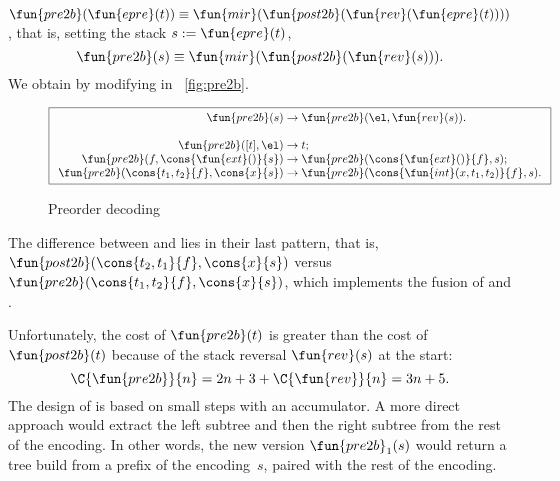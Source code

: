 \(\fun{pre2b}(\fun{epre}(t)) \equiv
\fun{mir}(\fun{post2b}(\fun{rev}(\fun{epre}(t))))\), that is, setting
the stack \(s := \fun{epre}(t)\),
\begin{equation*}
\abovedisplayskip=7pt
\belowdisplayskip=7pt
\fun{pre2b}(s) \equiv \fun{mir}(\fun{post2b}(\fun{rev}(s))).
\end{equation*}
We obtain  by modifying
 in \fig~\vref{fig:pre2b}.
\begin{figure}
\begin{equation*}
\boxed{
\begin{array}{r@{\;}c@{\;}l}
\fun{pre2b}(s) & \rightarrow & \fun{pre2b}(\el,\fun{rev}(s)).\\
\\
\fun{pre2b}([t],\el) & \rightarrow & t;\\
\fun{pre2b}(f,\cons{\fun{ext}()}{s}) & \rightarrow & \fun{pre2b}(\cons{\fun{ext}()}{f},s);\\
\fun{pre2b}(\cons{t_1,t_2}{f},\cons{x}{s}) & \rightarrow &
\fun{pre2b}(\cons{\fun{int}(x,t_1,t_2)}{f},s).
\end{array}}
\end{equation*}
\caption{Preorder decoding}
\label{fig:pre2b}
\end{figure}
The difference between  and
 lies in their last
pattern, that is, \(\fun{post2b}(\cons{t_2,t_1}{f},\cons{x}{s})\)
versus \(\fun{pre2b}(\cons{t_1,t_2}{f},\cons{x}{s})\), which
implements the fusion of  and
.

Unfortunately, the cost of \(\fun{pre2b}(t)\)
 is greater than the cost of
\(\fun{post2b}(t)\) because of the stack reversal \(\fun{rev}(s)\) at
the start:
\begin{equation*}
  \C{\fun{pre2b}}{n} = 2n + 3 + \C{\fun{rev}}{n} = 3n + 5.
  \index{pre2b@$\C{\fun{pre2b}}{n}$}\index{rev@$\C{\fun{rev}}{n}$}
\end{equation*}
The design of  is based on
small steps with an accumulator. A more direct approach would extract
the left subtree and then the right subtree from the rest of the
encoding. In other words, the new version
\(\fun{pre2b}_1(s)\) would return a
tree build from a prefix of the encoding~\(s\), paired with the rest
of the encoding.

